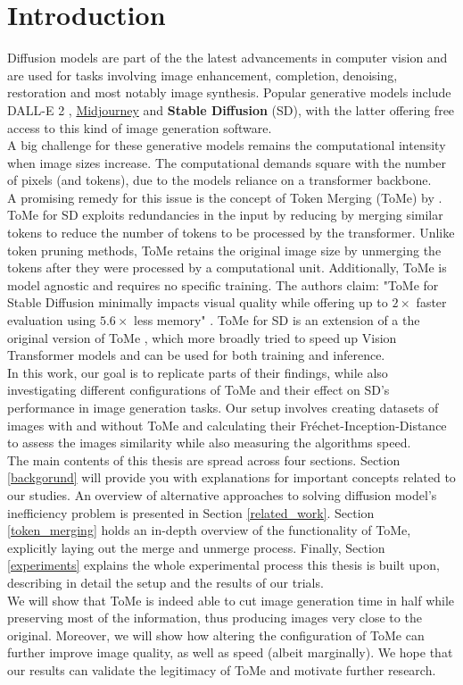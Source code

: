 \section{Introduction}
Diffusion models are part of the the latest advancements in computer vision and are used for tasks involving image enhancement, completion, denoising, restoration and most notably image synthesis. Popular generative models include DALL-E 2 \cite{ramesh2022hierarchical}, \href{https://www.midjourney.com}{Midjourney} and \textbf{Stable Diffusion} (SD), with the latter offering free access to this kind of image generation software.\\
A big challenge for these generative models remains the computational intensity when image sizes increase. The computational demands square with the number of pixels (and tokens), due to the models reliance on a transformer backbone.\\
A promising remedy for this issue is the concept of Token Merging (ToMe) by \cite{bolya2023tomesd}. ToMe for SD exploits redundancies in the input by reducing by merging similar tokens to reduce the number of tokens to be processed by the transformer. Unlike token pruning methods, ToMe retains the original image size by unmerging the tokens after they were processed by a computational unit. Additionally, ToMe is model agnostic and requires no specific training. The authors claim: "ToMe for Stable Diffusion minimally impacts visual quality while offering up to $2 \times$ faster evaluation using $5.6 \times$ less memory" \cite{bolya2023tomesd}. ToMe for SD is an extension of a the original version of ToMe \cite{bolya2023tome}, which more broadly tried to speed up Vision Transformer models \cite{dosovitskiy2020image} and can be used for both training and inference.\\
In this work, our goal is to replicate parts of their findings, while also investigating different configurations of ToMe and their effect on SD's performance in image generation tasks. Our setup involves creating datasets of images with and without ToMe and calculating their Fréchet-Inception-Distance to assess the images similarity while also measuring the algorithms speed.\\
The main contents of this thesis are spread across four sections. Section \ref{backgorund} will provide you with explanations for important concepts related to our studies. An overview of alternative approaches to solving diffusion model's inefficiency problem is presented in Section \ref{related_work}. Section \ref{token_merging} holds an in-depth overview of the functionality of ToMe, explicitly laying out the merge and unmerge process. Finally, Section \ref{experiments} explains the whole experimental process this thesis is built upon, describing in detail the setup and the results of our trials.\\
We will show that ToMe is indeed able to cut image generation time in half while preserving most of the information, thus producing images very close to the original. Moreover, we will show how altering the configuration of ToMe can further improve image quality, as well as speed (albeit marginally). We hope that our results can validate the legitimacy of ToMe and motivate further research.\\


